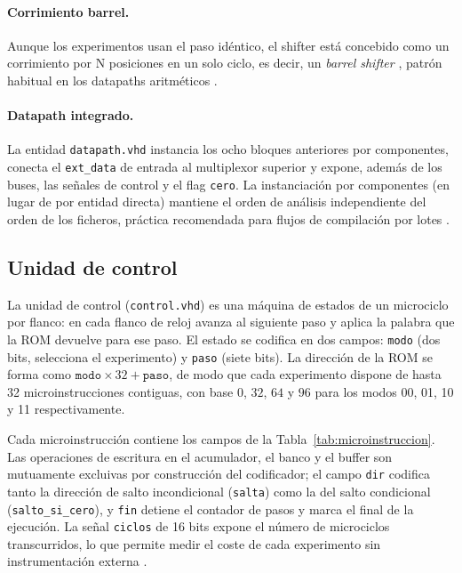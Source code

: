 \documentclass[llncs]{llncs}
\begin{document}
\paragraph{Corrimiento barrel.}
Aunque los experimentos usan el paso idéntico, el shifter está
concebido como un corrimiento por N posiciones en un solo ciclo, es
decir, un \emph{barrel shifter} \cite{wiki-barrel}, patrón habitual en
los datapaths aritméticos \cite{rabaey2002dic}.

\paragraph{Datapath integrado.}
La entidad \texttt{datapath.vhd} instancia los ocho bloques anteriores
por componentes, conecta el \texttt{ext\_data} de entrada al
multiplexor superior y expone, además de los buses, las señales de
control y el flag \texttt{cero}. La instanciación por componentes (en
lugar de por entidad directa) mantiene el orden de análisis
independiente del orden de los ficheros, práctica recomendada para
flujos de compilación por lotes \cite{ashenden2008vhdl}.

\subsection{Unidad de control}
\label{sec:control}

La unidad de control (\texttt{control.vhd}) es una máquina de estados
\cite{wiki-fsm} de un microciclo por flanco: en cada flanco de reloj
avanza al siguiente paso y aplica la palabra que la ROM devuelve para
ese paso. El estado se codifica en dos campos: \texttt{modo} (dos bits,
selecciona el experimento) y \texttt{paso} (siete bits). La dirección de
la ROM se forma como $\texttt{modo} \times 32 + \texttt{paso}$, de modo
que cada experimento dispone de hasta 32 microinstrucciones
contiguas, con base $0$, $32$, $64$ y $96$ para los modos 00, 01, 10 y
11 respectivamente.

Cada microinstrucción contiene los campos de la
Tabla~\ref{tab:microinstruccion}. Las operaciones de escritura en el
acumulador, el banco y el buffer son mutuamente excluivas por
construcción del codificador; el campo \texttt{dir} codifica tanto la
dirección de salto incondicional (\texttt{salta}) como la del salto
condicional (\texttt{salto\_si\_cero}), y \texttt{fin} detiene el
contador de pasos y marca el final de la ejecución. La señal
\texttt{ciclos} de 16 bits expone el número de microciclos transcurridos,
lo que permite medir el coste de cada experimento sin instrumentación
externa \cite{stallings2015coa}.
\end{document}
